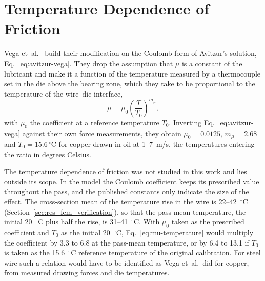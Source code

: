 \documentclass[subscriptcorrection,upint,varvw,barcolor=Goldenrod3,mathalfa=cal=euler,balance,hyphenate,french,pdf-a]{asmejour} %
\begin{document}

\appendix   %

\section{Temperature Dependence of Friction}\label{app:vega}

Vega et~al.\ \citep{vega2009temperature,vega2009investigation,haddi2011analysis} build their
modification on the Coulomb form of Avitzur's solution, Eq.~\eqref{eq:avitzur-vega}. They drop the
assumption that $\mu$ is a constant of the
lubricant and make it a function of the temperature measured by a thermocouple set in the die above
the bearing zone, which they take to be proportional to the temperature of the wire--die interface,
\begin{equation}
\mu = \mu_0\left(\frac{T}{T_0}\right)^{m_\mu},
\label{eq:mu-temperature}
\end{equation}
with $\mu_0$ the coefficient at a reference temperature $T_0$.
Inverting Eq.~\eqref{eq:avitzur-vega} against their own force measurements, they obtain
$\mu_0 = 0.0125$,
$m_\mu = 2.68$ and $T_0 = 15.6\,^\circ$C for copper drawn in oil at 1--7~m/s, the temperatures
entering the ratio in degrees Celsius.

The temperature dependence of friction was not studied in this work and lies outside its scope.
In the model the Coulomb coefficient keeps its prescribed value throughout the pass, and the
published constants only indicate the size of the effect. The cross-section mean of the
temperature rise in the wire is 22--42~$^\circ$C (Section~\ref{sec:res_fem_verification}), so that
the pass-mean temperature, the initial 20~$^\circ$C plus half the rise, is 31--41~$^\circ$C. With
$\mu_0$ taken as the prescribed coefficient and $T_0$ as the initial 20~$^\circ$C,
Eq.~\eqref{eq:mu-temperature} would multiply the coefficient by 3.3 to 6.8 at the pass-mean
temperature, or by 6.4 to 13.1 if $T_0$ is taken as the 15.6~$^\circ$C reference temperature of
the original calibration. For steel wire such a relation would have to be identified as Vega
et~al.\ did for copper, from measured drawing forces and die temperatures.
\end{document}
